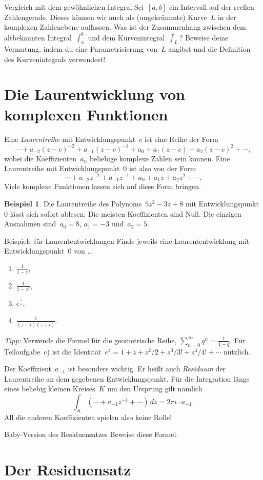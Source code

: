 \documentclass[twoside]{../zirkelblatt1415}
\theoremstyle{definition}
\newtheorem{bsp}[defn]{Beispiel}
\theoremstyle{plain}
\theoremstyle{remark}
\begin{document}
\begin{aufgabe}{Vergleich mit dem gewöhnlichen Integral}
Sei~$[a,b]$ ein Intervall auf der reellen Zahlengerade. Dieses können wir auch
als (ungekrümmte) Kurve~$L$ in der komplexen Zahlenebene auffassen. Was ist der
Zusammenhang zwischen dem altbekannten Integral~$\int_a^b$ und dem
Kurvenintegral~$\int_L$? Beweise deine Vermutung, indem du eine
Parametrisierung von~$L$ angibst und die Definition des Kurvenintegrals
verwendest!
\end{aufgabe}


\section{Die Laurentwicklung von komplexen Funktionen}

Eine \emph{Laurentreihe} mit Entwicklungspunkt~$c$ ist eine Reihe der Form
\[ \cdots + a_{-2} (z-c)^{-2} + a_{-1} (z-c)^{-1} + a_0 + a_1 (z-c) + a_2 (z-c)^2 + \cdots, \]
wobei die Koeffizienten~$a_n$ beliebige komplexe Zahlen sein können. Eine
Laurentreihe mit Entwicklungspunkt~$0$ ist also von der Form
\[ \cdots + a_{-2} z^{-2} + a_{-1} z^{-1} + a_0 + a_1 z + a_2 z^2 + \cdots. \]
Viele komplexe Funktionen lassen sich auf diese Form bringen.

\begin{bsp}Die Laurentreihe des Polynoms~$5 z^2 - 3z + 8$ mit
Entwicklungspunkt~$0$ lässt sich sofort ablesen: Die meisten Koeffizienten sind
Null. Die einzigen Ausnahmen sind~$a_0 = 8$, $a_1 = -3$ und~$a_2 = 5$.\end{bsp}

\begin{aufgabe}{Beispiele für Laurententwicklungen}
Finde jeweils eine Laurententwicklung mit Entwicklungspunkt~$0$ von \ldots
\begin{enumerate}
\item $\frac{1}{1 - z}$,
\item $\frac{1}{1 - z^2}$,
\item $e^{\frac{1}{z}}$,
\item $\frac{1}{(z - i) (z + i)}$.
\end{enumerate}
\emph{Tipp:} Verwende die Formel für die geometrische Reihe, $\sum_{n=0}^\infty
q^n = \frac{1}{1 - q}$. Für Teilaufgabe~c) ist die Identität~$e^z = 1 + z + z^2/2 +
z^3/3! + z^4/4! + \cdots$ nützlich.
\end{aufgabe}

Der Koeffizient~$a_{-1}$ ist besonders wichtig. Er heißt auch \emph{Residuum}
der Laurentreihe an dem gegebenen Entwicklungspunkt. Für die Integration längs
eines beliebig kleinen Kreises~$K$ um den Ursprung gilt nämlich
\[ \int_K (\cdots + a_{-1} z^{-1} + \cdots) \,dz = 2\pi i \cdot a_{-1}. \]
All die anderen Koeffizienten spielen also keine Rolle!

\begin{aufgabe}{Baby-Version des Residuensatzes}
Beweise diese Formel.
\end{aufgabe}


\section{Der Residuensatz}

\end{document}
